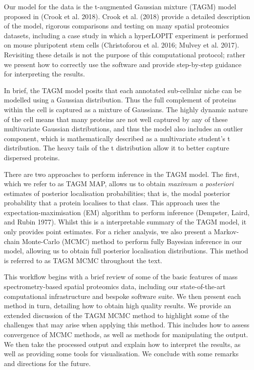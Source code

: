 \documentclass[]{article}
\begin{document}
Our model for the data is the t-augmented Gaussian mixture (TAGM) model
proposed in (Crook et al. 2018). Crook et al. (2018) provide a detailed
description of the model, rigorous comparisons and testing on many
spatial proteomics datasets, including a case study in which a
hyperLOPIT experiment is performed on mouse pluripotent stem cells
(Christoforou et al. 2016; Mulvey et al. 2017). Revisiting these details
is not the purpose of this computational protocol; rather we present how
to correctly use the software and provide step-by-step guidance for
interpreting the results.

In brief, the TAGM model posits that each annotated sub-cellular niche
can be modelled using a Gaussian distribution. Thus the full complement
of proteins within the cell is captured as a mixture of Gaussians. The
highly dynamic nature of the cell means that many proteins are not well
captured by any of these multivariate Gaussian distributions, and thus
the model also includes an outlier component, which is mathematically
described as a multivariate student's t distribution. The heavy tails of
the t distribution allow it to better capture dispersed proteins.

There are two approaches to perform inference in the TAGM model. The
first, which we refer to as TAGM MAP, allows us to obtain \emph{maximum
a posteriori} estimates of posterior localisation probabilities; that
is, the modal posterior probability that a protein localises to that
class. This approach uses the expectation-maximisation (EM) algorithm to
perform inference (Dempster, Laird, and Rubin 1977). Whilst this is a
interpretable summary of the TAGM model, it only provides point
estimates. For a richer analysis, we also present a Markov-chain
Monte-Carlo (MCMC) method to perform fully Bayesian inference in our
model, allowing us to obtain full posterior localisation distributions.
This method is referred to as TAGM MCMC throughout the text.

This workflow begins with a brief review of some of the basic features
of mass spectrometry-based spatial proteomics data, including our
state-of-the-art computational infrastructure and bespoke software
suite. We then present each method in turn, detailing how to obtain high
quality results. We provide an extended discussion of the TAGM MCMC
method to highlight some of the challenges that may arise when applying
this method. This includes how to assess convergence of MCMC methods, as
well as methods for manipulating the output. We then take the processed
output and explain how to interpret the results, as well as providing
some tools for visualisation. We conclude with some remarks and
directions for the future.
\end{document}
